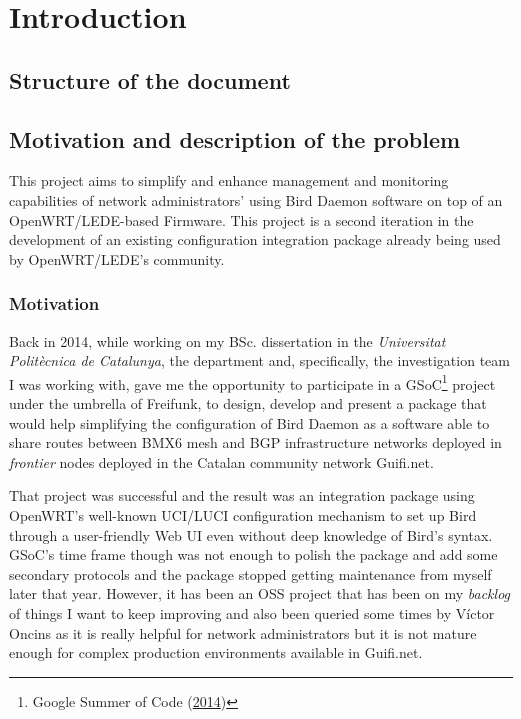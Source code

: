 \chapter{Introduction}
\label{ch:introduction}
\pagestyle{headings}

\section{Structure of the document}

\section{Motivation and description of the problem}
\label{sec:bdotp}
This project aims to simplify and enhance management and monitoring capabilities of network administrators' using Bird Daemon software on top of an OpenWRT/LEDE-based Firmware. This project is a second iteration in the development of an existing configuration integration package already being used by OpenWRT/LEDE's community.

\subsection{Motivation}
\label{sec:motivation}
Back in 2014, while working on my BSc. dissertation in the \textit{Universitat Politècnica de Catalunya}, the department and, specifically, the investigation team I was working with, gave me the opportunity to participate in a GSoC\footnote{Google Summer of Code (\href{https://www.google-melange.com/archive/gsoc/2014/orgs/freifunk/projects/eloicaso.html}{2014})} project under the umbrella of Freifunk, to design, develop and present  a package that would help simplifying the configuration of Bird Daemon as a software able to share routes between BMX6 mesh and BGP infrastructure networks deployed in \textit{frontier} nodes deployed in the Catalan community network Guifi.net.

That project was successful and the result was an integration package using OpenWRT's well-known UCI/LUCI configuration mechanism to set up Bird through a user-friendly Web UI even without deep knowledge of Bird's syntax. GSoC's time frame though was not enough to polish the package and add some secondary protocols and the package stopped getting maintenance from myself later that year. However, it has been an OSS project that has been on my \textit{backlog} of things I want to keep improving and also been queried some times by Víctor Oncins as it is really helpful for network administrators but it is not mature enough for complex production environments available in Guifi.net.

